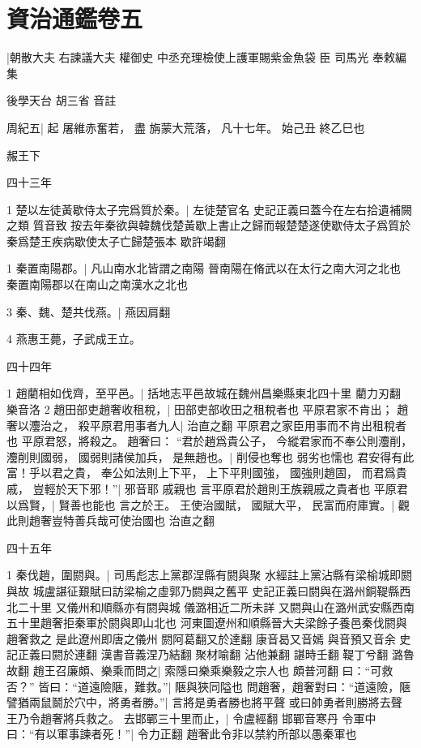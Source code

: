 \chapter{資治通鑑卷五}



\hfill {}  |{朝散大夫 右諫議大夫 權御史 中丞充理檢使上護軍賜紫金魚袋 臣} 司馬光 奉敕編集

\hfill 後學天台 胡三省 音註

周紀五|{
	起 屠維赤奮若，
	盡 旃蒙大荒落，
	凡十七年。
	始己丑
	終乙巳也
	}


赧王下


四十三年


1 楚以左徒黃歇侍太子完{\kern 2pt}爲質於秦。|{
	左徒楚官名
	史記正義曰蓋今在左右拾遺補闕之類
	質音致
	按去年秦欲與韓魏伐楚黃歇上書止之歸而報楚楚遂使歇侍太子爲質於秦爲楚王疾病歇使太子亡歸楚張本
	歇許竭翻
	}

1 秦置南陽郡。|{
	凡山南水北皆謂之南陽
	晉南陽在脩武以在太行之南大河之北也
	秦置南陽郡以在南山之南漢水之北也}

3 秦、魏、楚共伐燕。|{
	燕因肩翻}

4 燕惠王薨，子武成王立。


四十四年

1 趙藺相如伐齊，至平邑。|{
	括地志平邑故城在魏州昌樂縣東北四十里
	藺力刃翻
	樂音洛
	}
2 趙田部吏趙奢收租稅，|{
	田部吏部收田之租稅者也}
平原君家不肯出；
趙奢以灋治之，
殺平原君用事者九人|{
	治直之翻
	平原君之家臣用事而不肯出租稅者也}
平原君怒，將殺之。
趙奢曰：
“君於趙爲貴公子，
今縱君家而不奉公則灋削，
灋削則國弱，
國弱則諸侯加兵，
是無趙也。|{
	削侵也奪也
	弱劣也懦也}
君安得有此富！乎以君之貴，
奉公如法則上下平，
上下平則國強，
國強則趙固，
而君爲貴戚，
豈輕於天下邪！”|{
	邪音耶
	戚親也
	言平原君於趙則王族親戚之貴者也}
平原君以爲賢，|{
	賢善也能也}
言之於王。
王使治國賦，
國賦大平，
民富而府庫實。|{
	觀此則趙奢豈特善兵哉可使治國也
	治直之翻
	}


四十五年

1 秦伐趙，圍閼與。|{
	司馬彪志上黨郡涅縣有閼與聚
	水經註上黨沾縣有梁榆城即閼與故
	城盧諶征艱賦曰訪梁榆之虛郭乃閼與之舊平
	史記正義曰閼與在潞州銅鞮縣西北二十里
	又儀州和順縣亦有閼與城
	儀潞相近二所未詳
	又閼與山在潞州武安縣西南五十里趙奢拒秦軍於閼與即山北也
	河東圖遼州和順縣晉大夫梁餘子養邑秦伐閼與趙奢救之
	是此遼州即唐之儀州
	閼阿葛翻又於達翻
	康音曷又音嫣
	與音預又音余
	史記正義曰閼於連翻
	漢書音義涅乃結翻
	聚材喻翻
	沾他兼翻
	諶時壬翻
	鞮丁兮翻
	潞魯故翻
	}
趙王召廉頗、樂乘而問之|{
	索隱曰樂乘樂毅之宗人也
	頗普河翻
	}
曰：“可救否？”
皆曰：“道遠險陿，難救。”|{
	陿與狹同隘也
	}
問趙奢，趙奢對曰：“道遠險，陿譬猶兩鼠鬬於穴中，將勇者勝。”|{
	言將是勇者勝也將平聲
	或曰帥勇者則勝將去聲
	}
王乃令趙奢將兵救之。
去邯鄲三十里而止，|{
	令盧經翻
	邯鄲音寒丹}
令軍中曰：“有以軍事諫者死！”|{
	令力正翻
	趙奢此令非以禁約所部以愚秦軍也}

